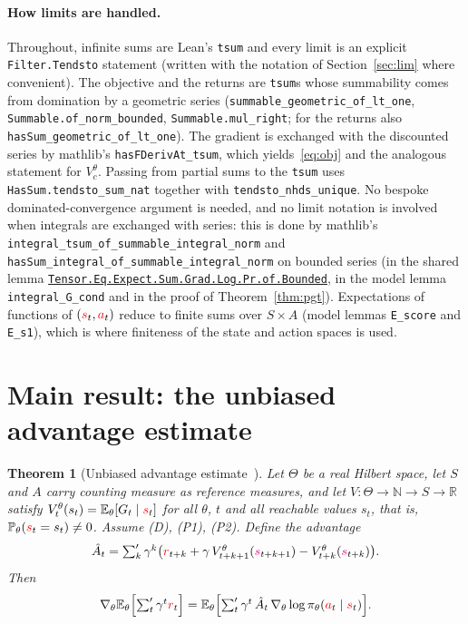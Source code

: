 \documentclass[11pt,a4paper]{article}
\newcommand{\lmod}[1]{\href{http://www.lemma.cn/lean/?module=#1}{\nolinkurl{#1}}}
\newtheorem{theorem}{Theorem}[section]
\newcommand{\R}{\mathbb{R}}
\newcommand{\N}{\mathbb{N}}
\newcommand{\E}{\mathbb{E}}
\newcommand{\Prb}{\mathbb{P}}
\newcommand{\rv}[1]{{\color{red}#1}}       %
\newcommand{\ra}[1]{{\color{magenta}#1}}   %
\newcommand{\sv}{\rv{s}}
\newcommand{\av}{\rv{a}}
\newcommand{\rw}{\rv{r}}
\newcommand{\grad}{\nabla_{\theta}}
\newcommand{\tsum}{\textstyle\sum'}
\begin{document}
\paragraph{How limits are handled.}
Throughout, infinite sums are Lean's \texttt{tsum} and every limit is an explicit \texttt{Filter.Tendsto} statement (written with the notation of Section~\ref{sec:lim} where convenient).
The objective and the returns are \texttt{tsum}s whose summability comes from domination by a geometric series (\texttt{summable\_geometric\_of\_lt\_one}, \texttt{Summable.of\_norm\_bounded}, \texttt{Summable.mul\_right}; for the returns also \texttt{hasSum\_geometric\_of\_lt\_one}).
The gradient is exchanged with the discounted series by mathlib's \texttt{hasFDerivAt\_tsum}, which yields~\eqref{eq:obj} and the analogous statement for $V_c^\theta$.
Passing from partial sums to the \texttt{tsum} uses \texttt{HasSum.tendsto\_sum\_nat} together with \texttt{tendsto\_nhds\_unique}.
No bespoke dominated-convergence argument is needed, and no limit notation is involved when integrals are exchanged with series: this is done by mathlib's \texttt{integral\_tsum\_of\_summable\_integral\_norm} and \texttt{hasSum\_integral\_of\_summable\_integral\_norm} on bounded series (in the shared lemma \lmod{Tensor.Eq.Expect.Sum.Grad.Log.Pr.of.Bounded}, in the model lemma \texttt{integral\_G\_cond} and in the proof of Theorem~\ref{thm:pgt}). Expectations of functions of $(\sv_t,\av_t)$ reduce to finite sums over $S\times A$ (model lemmas \texttt{E\_score} and \texttt{E\_s1}), which is where finiteness of the state and action spaces is used.

\section{Main result: the unbiased advantage estimate}
\label{sec:main}

\begin{theorem}[Unbiased advantage estimate~\cite{lemma_uae}]
\label{thm:main}
Let $\Theta$ be a real Hilbert space, let $S$ and $A$ carry counting measure as reference measures, and let $V:\Theta\to\N\to S\to\R$ satisfy
$V^\theta_t(s_t)=\E_\theta[G_t\mid\sv_t]$ for all $\theta$, $t$ and all reachable values $s_t$, that is, $\Prb_\theta(\sv_t=s_t)\neq0$.
Assume (D), (P1), (P2).
Define the advantage
\[
\hat A_t=\tsum_k\gamma^k\bigl(\rw_{t+k}+\gamma\,V^\theta_{t+k+1}(\ra{s}_{t+k+1})-V^\theta_{t+k}(\ra{s}_{t+k})\bigr).
\]
Then
\[
\grad\E_\theta\Bigl[\tsum_t\gamma^t\rw_t\Bigr]=\E_\theta\Bigl[\tsum_t\gamma^t\,\hat A_t\,\grad\log\pi_\theta(\av_t\mid\sv_t)\Bigr].
\]
\end{theorem}
\end{document}
